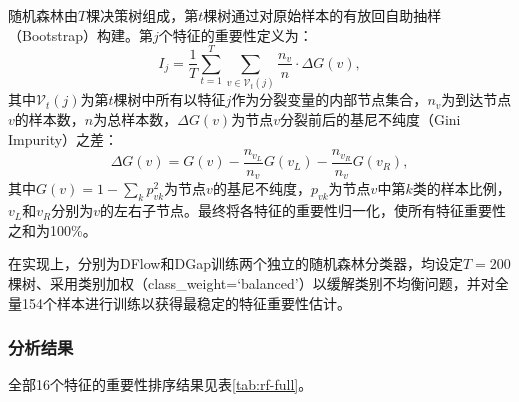 \documentclass[UTF8,a4paper,12pt]{ctexart}
\begin{document}
随机森林由$T$棵决策树组成，第$t$棵树通过对原始样本的有放回自助抽样（Bootstrap）构建。第$j$个特征的重要性定义为：
\begin{equation}
I_j=\frac{1}{T}\sum_{t=1}^{T}\sum_{v\in\mathcal{V}_t(j)}\frac{n_v}{n}\cdot\Delta G(v),
\label{eq:rf_importance}
\end{equation}
其中$\mathcal{V}_t(j)$为第$t$棵树中所有以特征$j$作为分裂变量的内部节点集合，$n_v$为到达节点$v$的样本数，$n$为总样本数，$\Delta G(v)$为节点$v$分裂前后的基尼不纯度（Gini Impurity）之差：
\begin{equation}
\Delta G(v)=G(v)-\frac{n_{v_L}}{n_v}G(v_L)-\frac{n_{v_R}}{n_v}G(v_R),
\end{equation}
其中$G(v)=1-\sum_{k}p_{vk}^2$为节点$v$的基尼不纯度，$p_{vk}$为节点$v$中第$k$类的样本比例，$v_L$和$v_R$分别为$v$的左右子节点。最终将各特征的重要性归一化，使所有特征重要性之和为100\%。

在实现上，分别为DFlow和DGap训练两个独立的随机森林分类器，均设定$T=200$棵树、采用类别加权（class\_weight=`balanced'）以缓解类别不均衡问题，并对全量154个样本进行训练以获得最稳定的特征重要性估计。

\subsubsection{分析结果}

全部16个特征的重要性排序结果见表\ref{tab:rf-full}。
\end{document}

